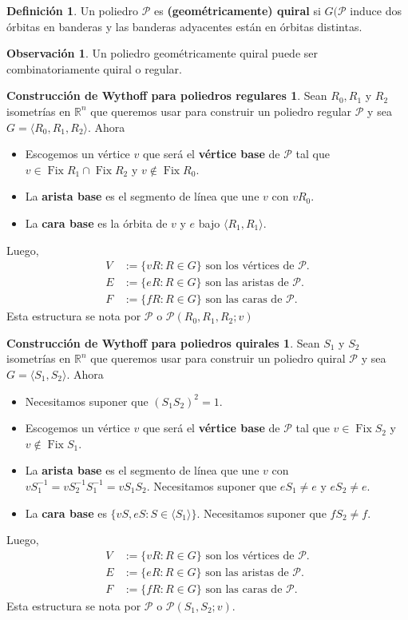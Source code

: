 \documentclass[spanish]{article}
\theoremstyle{definition}
\newtheorem*{defn}{Definición}
\newtheorem*{obs}{Observación}
\newtheorem*{Wreg}{Construcción de Wythoff para poliedros regulares}
\newtheorem*{Wqui}{Construcción de Wythoff para poliedros quirales}
\newcommand{\R}{\mathbb{R}}
\newcommand{\p}{\mathcal{P}}
\DeclareMathOperator{\Fix}{Fix}
\begin{document}
\begin{defn}
	Un poliedro $\mathcal{P}$ es \textbf{(geométricamente) quiral} si $G(\mathcal{P}$ induce dos órbitas en banderas y las banderas adyacentes están en órbitas distintas.
\end{defn}
\begin{obs}
	Un poliedro geométricamente quiral puede ser combinatoriamente quiral o regular.
\end{obs}

\begin{Wreg}Sean $R_0,R_1$ y $R_2$ isometrías en $\R^n$ que queremos usar para construir un poliedro regular $\p$  y sea $G=\langle R_0,R_1,R_2\rangle$. Ahora
\begin{itemize}
	\item Escogemos un vértice $v$ que será el \textbf{vértice base} de $\p$ tal que $v\in\Fix R_1\cap\Fix R_2$ y $v\notin\Fix R_0$.
	\item La \textbf{arista base} es el segmento de línea que une $v$ con $vR_0$.
	\item La \textbf{cara base} es la órbita de $v$ y $e$ bajo $\langle R_1,R_1\rangle$.
\end{itemize}
Luego,
\begin{align*}
	V&:=\{vR:R\in G\}\text{ son los vértices de } \p.\\ 
	E&:=\{eR:R\in G\} \text{ son las aristas de } \p.\\ 
	F&:=\{fR:R\in G\} \text{ son las caras de } \p.
\end{align*}
Esta estructura se nota por $\p$ o $\p(R_0,R_1,R_2;v)$
\end{Wreg}

\begin{Wqui}
	Sean $S_1$ y $S_2$ isometrías en $\R^n$ que queremos usar para construir un poliedro quiral $\p$  y sea $G=\langle S_1,S_2\rangle$. Ahora
	\begin{itemize}
		\item Necesitamos suponer que $(S_1S_2)^2=1$.
		\item Escogemos un vértice $v$ que será el \textbf{vértice base} de $\p$ tal que $v\in\Fix S_2$ y $v\notin\Fix S_1$.
		\item La \textbf{arista base} es el segmento de línea que une $v$ con $vS_1^{-1}=vS_2^{-1}S_1^{-1}=vS_1S_2$. Necesitamos suponer que $eS_1\neq e$ y $eS_2\neq e$.
		\item La \textbf{cara base} es $\{vS,eS:S\in\langle S_1\rangle\}$. Necesitamos suponer que $fS_2\neq f$.
	\end{itemize}
	Luego,
	\begin{align*}
		V&:=\{vR:R\in G\}\text{ son los vértices de } \p.\\ 
		E&:=\{eR:R\in G\} \text{ son las aristas de } \p.\\ 
		F&:=\{fR:R\in G\} \text{ son las caras de } \p.
	\end{align*}
	Esta estructura se nota por $\p$ o $\p(S_1,S_2;v)$.
\end{Wqui}
\end{document}
